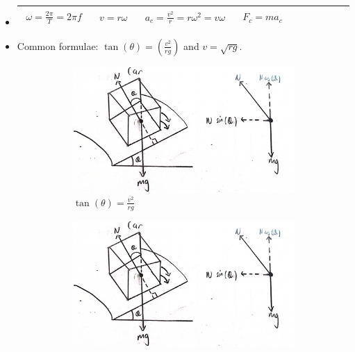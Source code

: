 \documentclass[oneside]{book}
\begin{document}
\begin{itemize}[label=\(\square\)]
    \item \begin{tabular}{|Sc|Sc|Sc|Sc|Sc|}
        \hline
            \(\begin{aligned}
                \omega=\frac{2\pi}{T}=2\pi f
            \end{aligned}\)&
            \(\begin{aligned}
                v=r\omega
            \end{aligned}\)&
            \(\begin{aligned}
                a_c=\frac{v^2}{r}=r\omega^2=v\omega
            \end{aligned}\)&
            \(\begin{aligned}
                F_c=ma_c
            \end{aligned}\)
        \\
        \hline
    \end{tabular}
    \item Common formulae: \(\tan(\theta)=\left(\frac{v^2}{rg}\right)\) and \(v=\sqrt{rg}\).
    \begin{figure}[H]
        \centering
        \begin{subfigure}[c]{0.55\textwidth}
            \centering
            \includegraphics[width=\textwidth,page=1]{../images/Circular-motion-examples.pdf}
            \caption{\(\tan(\theta)=\frac{v^2}{rg}\)}
        \end{subfigure}%
        \hfill
        \begin{subfigure}[c]{0.35\textwidth}
            \centering
            \vspace{0.5cm}
            \includegraphics[width=\textwidth,page=2]{../images/Circular-motion-examples.pdf}

\end{subfigure}
\end{figure}
\end{itemize}
\end{document}
